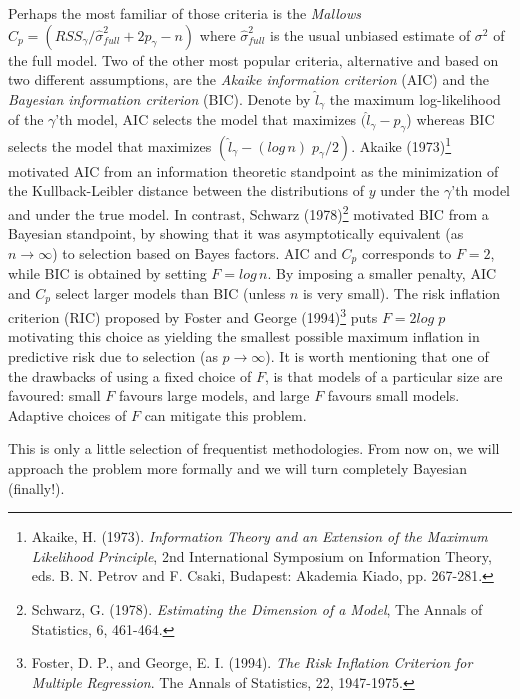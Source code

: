 \documentclass[11 pt]{article}
\begin{document}
\begin{multicols}{2}
Perhaps the most familiar of those criteria is the \textit{Mallows} $C_p = (RSS_\gamma/\hat{\sigma}^2_{full} + 2 p_\gamma - n)$
where $\hat{\sigma}^2_{full}$ is the usual unbiased estimate of $\sigma^2$ of the full model. Two of the other most popular criteria, alternative and based on two different assumptions, are the \textit{Akaike information criterion} (AIC) and the \textit{Bayesian information criterion} (BIC). Denote by $\hat{l}_\gamma$ the maximum log-likelihood of the $\gamma$'th model, AIC selects the model that maximizes $(\hat{l}_\gamma - p_\gamma$) whereas BIC selects the model that maximizes $\left(\hat{l}_\gamma - (log\,n) \; p_\gamma/2 \right)$. Akaike (1973)\footnote{Akaike, H. (1973). \textit{Information Theory and an Extension of the Maximum Likelihood Principle}, 2nd International Symposium on Information Theory, eds. B. N. Petrov and F. Csaki, Budapest: Akademia Kiado, pp. 267-281.} motivated AIC from an information theoretic standpoint as the minimization of the Kullback-Leibler distance between the distributions of $y$ under the $\gamma$'th model and under the true model. In contrast, Schwarz (1978)\footnote{Schwarz, G. (1978). \textit{Estimating the Dimension of a Model}, The Annals of Statistics, 6, 461-464.} motivated BIC from a Bayesian standpoint, by showing that it was asymptotically equivalent (as $n \to \infty$) to selection based on Bayes factors. AIC and $C_p$ corresponds to $F = 2$, while BIC is obtained by setting $F = log\, n$. By imposing a smaller penalty, AIC and $C_p$ select larger models than BIC (unless $n$ is very small). The risk inflation criterion (RIC) proposed by Foster and George (1994)\footnote{Foster, D. P., and George, E. I. (1994). \textit{The Risk Inflation Criterion for Multiple Regression}. The Annals of Statistics, 22, 1947-1975.} puts $F = 2 log\;p$ motivating this choice as yielding the smallest possible maximum inflation in predictive risk due to selection (as $p \to\infty$). It is worth mentioning that one of the drawbacks of using a fixed choice of $F$, is that models of a particular size are favoured: small $F$ favours large models, and large $F$ favours small models. Adaptive choices of $F$ can mitigate this problem.

This is only a little selection of frequentist methodologies. From now on, we will approach the problem more formally and we will turn completely Bayesian (finally!).





\end{multicols}
\end{document}
